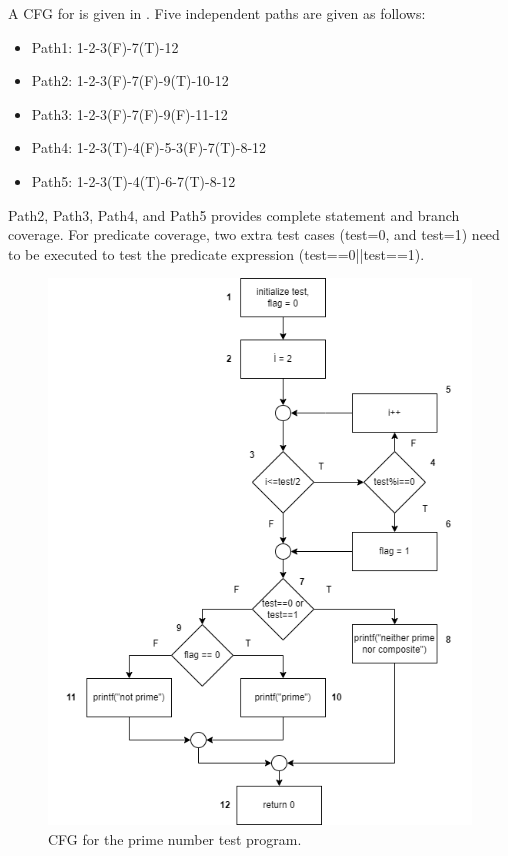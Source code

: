 A CFG for  is given in . Five independent paths are given as follows:

\begin{itemize}
        \item Path1: 1-2-3(F)-7(T)-12
        \item Path2: 1-2-3(F)-7(F)-9(T)-10-12
        \item Path3: 1-2-3(F)-7(F)-9(F)-11-12
        \item Path4: 1-2-3(T)-4(F)-5-3(F)-7(T)-8-12 
        \item Path5: 1-2-3(T)-4(T)-6-7(T)-8-12 
\end{itemize}

Path2, Path3, Path4, and Path5 provides complete statement and branch coverage. For predicate coverage, two extra test cases (test=0, and test=1) need to be executed to test the predicate expression (test==0||test==1).

\begin{figure}[!ht]
    \includegraphics{images/cfg-36.png}
    \caption{CFG for the prime number test program.}
\end{figure}

